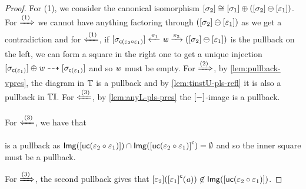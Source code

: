 \begin{proof}
    For (1), we consider the canonical isomorphism $[\sigma_2] \cong [\sigma_1] \oplus ([\sigma_2] \ominus [\varepsilon_1])$.
    For $\xRightarrow{(1)}$ we cannot have anything factoring through $([\sigma_2] \ominus [\varepsilon_1])$ as we get a contradiction 
    and for $\xLeftarrow{(1)}$, if $[\sigma_{\mathsf{c}(\varepsilon_2 \circ \varepsilon_1)}] \xleftarrow{\pi_1} \mathit{w} \xrightarrow{\pi_2} ([\sigma_2] \ominus [\varepsilon_1])$ is the pullback
    on the left, we can form a square in the right one to get a unique injection $[\sigma_{\mathsf{c}(\varepsilon_1)}] \oplus \mathit{w} \dashrightarrow [\sigma_{\mathsf{c}(\varepsilon_1)}]$
    and so $\mathit{w}$ must be empty.
    For $\xRightarrow{(2)}$, by \cref{lem:pullback-vpres}, the diagram in $\mathbb{T}$ is a pullback and by 
    \cref{lem:tinstU-pls-refl} it is also a pullback in ${\mathbb{T}\mathbb{I}}$.
    For $\xLeftarrow{(3)}$, by \cref{lem:anyL-pls-pres} the $[-]$-image is a pullback.

    For $\xLeftarrow{(3)}$, we have that 
    is a pullback as $\mathsf{Img}([\mathsf{uc}(\varepsilon_2 \circ \varepsilon_1)]) \cap \mathsf{Img}({[\mathsf{uc}(\varepsilon_2 \circ \varepsilon_1)]}^\mathsf{c}) = \emptyset$ and so the inner square must be a pullback.

    For $\xRightarrow{(3)}$, the second pullback gives that $[\varepsilon_2]({[\varepsilon_1]}^\mathsf{c}(\mathit{a})) \not\in \mathsf{Img}([\mathsf{uc}(\varepsilon_2 \circ \varepsilon_1)])$.
    
\end{proof}

